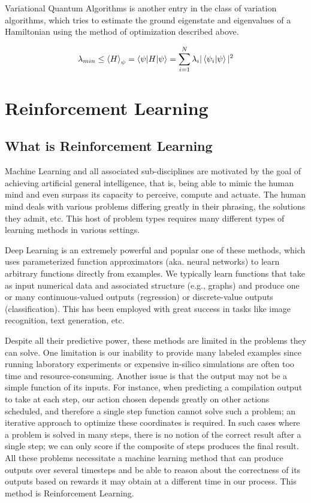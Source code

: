 Variational Quantum Algorithms is another entry in the class of variation algorithms, which tries to estimate the ground eigenstate and eigenvalues of a Hamiltonian using the method of optimization described above.

\begin{equation}
    \lambda_{min} \leq \braket{H}_{\psi} = \braket{\psi \vert H \vert \psi} = \sum_{i=1}^{N} \lambda_i \vert \braket{\psi_i \vert \psi} \vert ^2
\end{equation}

\section{Reinforcement Learning}

\subsection{What is Reinforcement Learning}

Machine Learning and all associated sub-disciplines are motivated by the goal of achieving artificial general intelligence, that is, being able to mimic the human mind and even surpass its capacity to perceive, compute and actuate. The human mind deals with various problems differing greatly in their phrasing, the solutions they admit, etc. This host of problem types requires many different types of learning methods in various settings.

Deep Learning is an extremely powerful and popular one of these methods, which uses parameterized function approximators (aka. neural networks) to learn arbitrary functions directly from examples. We typically learn functions that take as input numerical data and associated structure (e.g., graphs) and produce one or many continuous-valued outputs (regression) or discrete-value outputs (classification). This has been employed with great success in tasks like image recognition, text generation, etc.

Despite all their predictive power, these methods are limited in the problems they can solve. One limitation is our inability to provide many labeled examples since running laboratory experiments or expensive in-silico simulations are often too time and resource-consuming. Another issue is that the output may not be a simple function of its inputs. For instance, when predicting a compilation output to take at each step, our action chosen depends greatly on other actions scheduled, and therefore a single step function cannot solve such a problem; an iterative approach to optimize these coordinates is required. In such cases where a problem is solved in many steps, there is no notion of the correct result after a single step; we can only score if the composite of steps produces the final result. All these problems necessitate a machine learning method that can produce outputs over several timesteps and be able to reason about the correctness of its outputs based on rewards it may obtain at a different time in our process. This method is Reinforcement Learning. \cite{rl-intro-sutton-barto}


